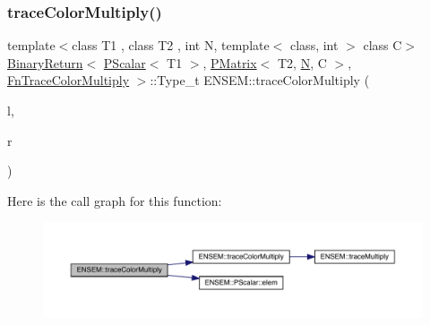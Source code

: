 \subsubsection{\texorpdfstring{traceColorMultiply()}{traceColorMultiply()}\hspace{0.1cm}{\footnotesize\ttfamily [3/3]}}
{\footnotesize\ttfamily template$<$class T1 , class T2 , int N, template$<$ class, int $>$ class C$>$ \\
\mbox{\hyperlink{structENSEM_1_1BinaryReturn}{Binary\+Return}}$<$ \mbox{\hyperlink{classENSEM_1_1PScalar}{P\+Scalar}}$<$ T1 $>$, \mbox{\hyperlink{classENSEM_1_1PMatrix}{P\+Matrix}}$<$ T2, \mbox{\hyperlink{adat__devel_2lib_2hadron_2operator__name__util_8cc_a7722c8ecbb62d99aee7ce68b1752f337}{N}}, C $>$, \mbox{\hyperlink{structENSEM_1_1FnTraceColorMultiply}{Fn\+Trace\+Color\+Multiply}} $>$\+::Type\+\_\+t E\+N\+S\+E\+M\+::trace\+Color\+Multiply (\begin{DoxyParamCaption}\item[{const \mbox{\hyperlink{classENSEM_1_1PScalar}{P\+Scalar}}$<$ T1 $>$ \&}]{l,  }\item[{const \mbox{\hyperlink{classENSEM_1_1PMatrix}{P\+Matrix}}$<$ T2, \mbox{\hyperlink{adat__devel_2lib_2hadron_2operator__name__util_8cc_a7722c8ecbb62d99aee7ce68b1752f337}{N}}, C $>$ \&}]{r }\end{DoxyParamCaption})\hspace{0.3cm}{\ttfamily [inline]}}

Here is the call graph for this function\+:\nopagebreak
\begin{figure}[H]
\begin{center}
\leavevmode
\includegraphics[width=350pt]{df/d0a/group__primmatrix_gad73631cec5794d9c294bbf815af14cc0_cgraph}
\end{center}
\end{figure}
\mbox{\label{group__primmatrix_ga91e09af0f8d2d70627950b973f6b41ec}} 
